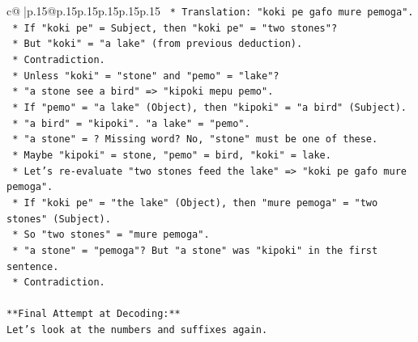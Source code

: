 \documentclass{article}
\begin{document}
{\begin{supertabular}{c@{$\;$}|p{.15\linewidth}@{}p{.15\linewidth}p{.15\linewidth}p{.15\linewidth}p{.15\linewidth}p{.15\linewidth}}
{{{\texttt{                                                    *   Translation: "koki pe gafo mure pemoga".} \\
\texttt{                                                    *   If "koki pe" = Subject, then "koki pe" = "two stones"?} \\
\texttt{                                                    *   But "koki" = "a lake" (from previous deduction).} \\
\texttt{                                                    *   Contradiction.} \\
\texttt{                                                    *   Unless "koki" = "stone" and "pemo" = "lake"?} \\
\texttt{                                                        *   "a stone see a bird" => "kipoki mepu pemo".} \\
\texttt{                                                        *   If "pemo" = "a lake" (Object), then "kipoki" = "a bird" (Subject).} \\
\texttt{                                                        *   "a bird" = "kipoki". "a lake" = "pemo".} \\
\texttt{                                                        *   "a stone" = ? Missing word? No, "stone" must be one of these.} \\
\texttt{                                                        *   Maybe "kipoki" = stone, "pemo" = bird, "koki" = lake.} \\
\texttt{                                                        *   Let's re{-}evaluate "two stones feed the lake" => "koki pe gafo mure pemoga".} \\
\texttt{                                                            *   If "koki pe" = "the lake" (Object), then "mure pemoga" = "two stones" (Subject).} \\
\texttt{                                                            *   So "two stones" = "mure pemoga".} \\
\texttt{                                                            *   "a stone" = "pemoga"? But "a stone" was "kipoki" in the first sentence.} \\
\texttt{                                                            *   Contradiction.} \\
\\ 
\texttt{**Final Attempt at Decoding:**} \\
\texttt{Let's look at the numbers and suffixes again.} \\
}}}
\end{supertabular}}
\end{document}
